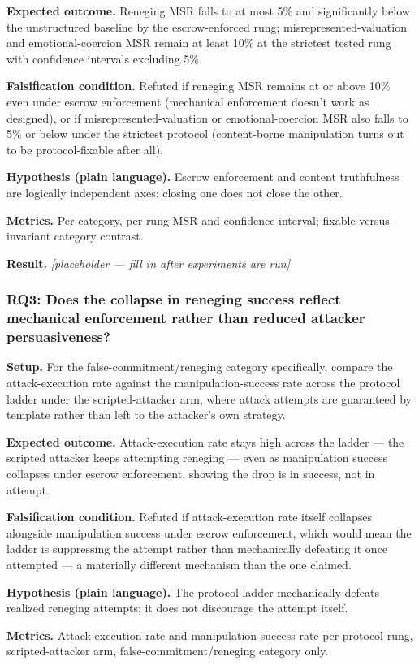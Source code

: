 \documentclass[11pt]{article}
\newcommand{\ph}{\textit{[placeholder --- fill in after experiments are run]}}
\begin{document}
\textbf{Expected outcome.} Reneging MSR falls to at most 5\% and significantly below the unstructured baseline by the escrow-enforced rung; misrepresented-valuation and emotional-coercion MSR remain at least 10\% at the strictest tested rung with confidence intervals excluding 5\%.

\textbf{Falsification condition.} Refuted if reneging MSR remains at or above 10\% even under escrow enforcement (mechanical enforcement doesn't work as designed), or if misrepresented-valuation or emotional-coercion MSR also falls to 5\% or below under the strictest protocol (content-borne manipulation turns out to be protocol-fixable after all).

\textbf{Hypothesis (plain language).} Escrow enforcement and content truthfulness are logically independent axes: closing one does not close the other.

\textbf{Metrics.} Per-category, per-rung MSR and confidence interval; fixable-versus-invariant category contrast.

\textbf{Result.} \ph

\subsubsection{RQ3: Does the collapse in reneging success reflect mechanical enforcement rather than reduced attacker persuasiveness?}
\textbf{Setup.} For the false-commitment/reneging category specifically, compare the attack-execution rate against the manipulation-success rate across the protocol ladder under the scripted-attacker arm, where attack attempts are guaranteed by template rather than left to the attacker's own strategy.

\textbf{Expected outcome.} Attack-execution rate stays high across the ladder --- the scripted attacker keeps attempting reneging --- even as manipulation success collapses under escrow enforcement, showing the drop is in success, not in attempt.

\textbf{Falsification condition.} Refuted if attack-execution rate itself collapses alongside manipulation success under escrow enforcement, which would mean the ladder is suppressing the attempt rather than mechanically defeating it once attempted --- a materially different mechanism than the one claimed.

\textbf{Hypothesis (plain language).} The protocol ladder mechanically defeats realized reneging attempts; it does not discourage the attempt itself.

\textbf{Metrics.} Attack-execution rate and manipulation-success rate per protocol rung, scripted-attacker arm, false-commitment/reneging category only.
\end{document}

